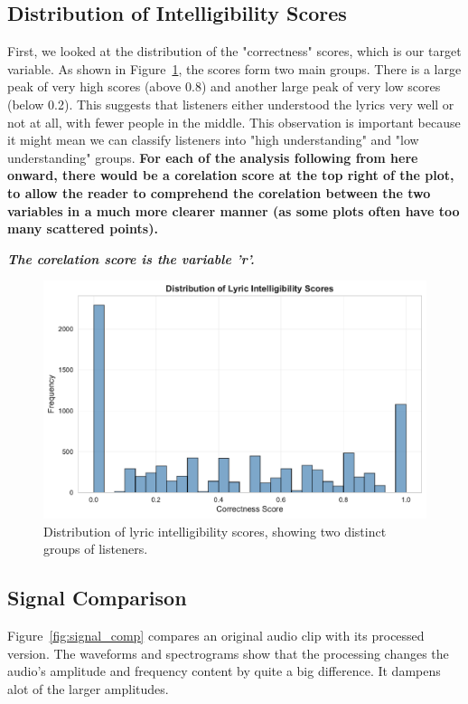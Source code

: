 \documentclass[conference]{IEEEtran}
\begin{document}
\subsection{Distribution of Intelligibility Scores}
First, we looked at the distribution of the "correctness" scores, which is our target variable. As shown in Figure~\ref{fig:target_dist}, the scores form two main groups. There is a large peak of very high scores (above 0.8) and another large peak of very low scores (below 0.2). This suggests that listeners either understood the lyrics very well or not at all, with fewer people in the middle. This observation is important because it might mean we can classify listeners into "high understanding" and "low understanding" groups. \textbf{For each of the analysis following from here onward, there would be a corelation score at the top right of the plot,  to allow the reader to comprehend the corelation between the two variables in a much more clearer manner (as some plots often have too many scattered points).}

\textit{\textbf{The corelation score is the variable 'r'.
}}
\begin{figure}[htbp]
    \centering
    \includegraphics[width=\columnwidth]{plots/figure_1_target_distribution.pdf}
    \caption{Distribution of lyric intelligibility scores, showing two distinct groups of listeners.}
    \label{fig:target_dist}
\end{figure}

\subsection{Signal Comparison}
Figure~\ref{fig:signal_comp} compares an original audio clip with its processed version. The waveforms and spectrograms show that the processing changes the audio's amplitude and frequency content by quite a big difference. It dampens alot of the larger amplitudes.
\end{document}
